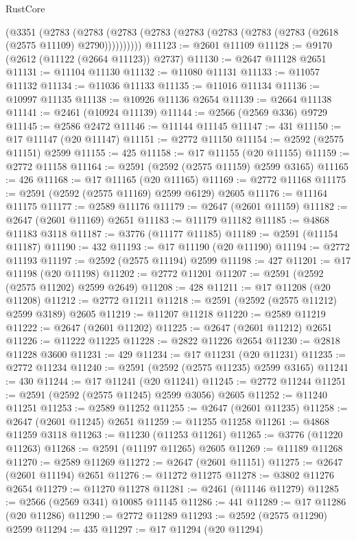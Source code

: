 \begin{lexlean}{RustCore}
\begin{coremodule}
    (@3351
      (@2783 (@2783 (@2783 (@2783 (@2783 (@2783 (@2783 (@2783 (@2618 (@2575 @11109) @2790))))))))))
@11123 := @2601 @11109
@11128 := @9170 (@2612 (@11122 (@2664 @11123)) @2737)
@11130 := @2647 @11128 @2651
@11131 := @11104 @11130
@11132 := @11080 @11131
@11133 := @11057 @11132
@11134 := @11036 @11133
@11135 := @11016 @11134
@11136 := @10997 @11135
@11138 := @10926 @11136 @2654
@11139 := @2664 @11138
@11141 := @2461 (@10924 @11139)
@11144 := @2566 (@2569 @336) @9729
@11145 := @2586 @2472
@11146 := @11144 @11145
@11147 := 431
@11150 := @17 @11147 (@20 @11147)
@11151 := @2772 @11150
@11154 := @2592 (@2575 @11151) @2599
@11155 := 425
@11158 := @17 @11155 (@20 @11155)
@11159 := @2772 @11158
@11164 := @2591 (@2592 (@2575 @11159) @2599 @3165)
@11165 := 426
@11168 := @17 @11165 (@20 @11165)
@11169 := @2772 @11168
@11175 := @2591 (@2592 (@2575 @11169) @2599 @6129) @2605
@11176 := @11164 @11175
@11177 := @2589 @11176
@11179 := @2647 (@2601 @11159)
@11182 := @2647 (@2601 @11169) @2651
@11183 := @11179 @11182
@11185 := @4868 @11183 @3118
@11187 := @3776 (@11177 @11185)
@11189 := @2591 (@11154 @11187)
@11190 := 432
@11193 := @17 @11190 (@20 @11190)
@11194 := @2772 @11193
@11197 := @2592 (@2575 @11194) @2599
@11198 := 427
@11201 := @17 @11198 (@20 @11198)
@11202 := @2772 @11201
@11207 := @2591 (@2592 (@2575 @11202) @2599 @2649)
@11208 := 428
@11211 := @17 @11208 (@20 @11208)
@11212 := @2772 @11211
@11218 := @2591 (@2592 (@2575 @11212) @2599 @3189) @2605
@11219 := @11207 @11218
@11220 := @2589 @11219
@11222 := @2647 (@2601 @11202)
@11225 := @2647 (@2601 @11212) @2651
@11226 := @11222 @11225
@11228 := @2822 @11226 @2654
@11230 := @2818 @11228 @3600
@11231 := 429
@11234 := @17 @11231 (@20 @11231)
@11235 := @2772 @11234
@11240 := @2591 (@2592 (@2575 @11235) @2599 @3165)
@11241 := 430
@11244 := @17 @11241 (@20 @11241)
@11245 := @2772 @11244
@11251 := @2591 (@2592 (@2575 @11245) @2599 @3056) @2605
@11252 := @11240 @11251
@11253 := @2589 @11252
@11255 := @2647 (@2601 @11235)
@11258 := @2647 (@2601 @11245) @2651
@11259 := @11255 @11258
@11261 := @4868 @11259 @3118
@11263 := @11230 (@11253 @11261)
@11265 := @3776 (@11220 @11263)
@11268 := @2591 (@11197 @11265) @2605
@11269 := @11189 @11268
@11270 := @2589 @11269
@11272 := @2647 (@2601 @11151)
@11275 := @2647 (@2601 @11194) @2651
@11276 := @11272 @11275
@11278 := @3802 @11276 @2654
@11279 := @11270 @11278
@11281 := @2461 (@11146 @11279)
@11285 := @2566 (@2569 @341) @10085 @11145
@11286 := 441
@11289 := @17 @11286 (@20 @11286)
@11290 := @2772 @11289
@11293 := @2592 (@2575 @11290) @2599
@11294 := 435
@11297 := @17 @11294 (@20 @11294)

\end{coremodule}
\end{lexlean}
